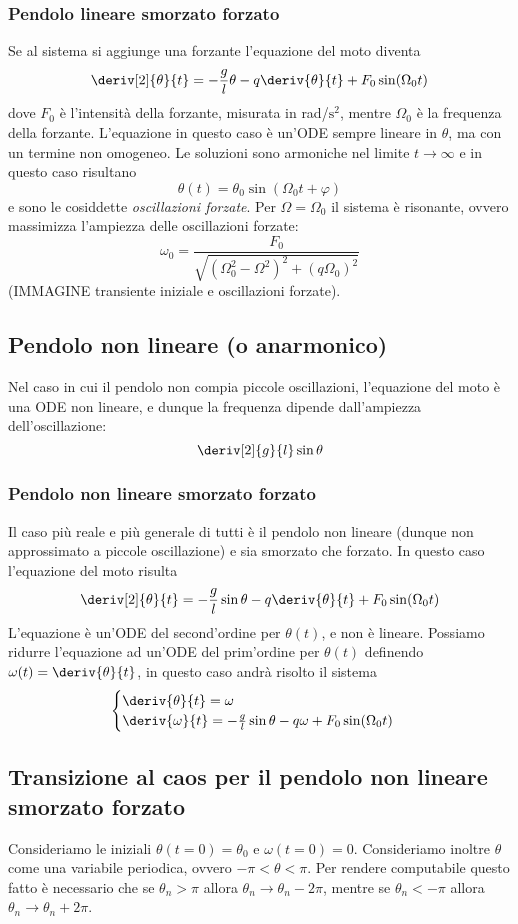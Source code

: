 \subsubsection{Pendolo lineare smorzato forzato}
Se al sistema si aggiunge una forzante l'equazione del moto diventa
\[
\deriv[2]{\theta}{t} = - \frac{g}{l} \theta - q \deriv{\theta}{t} + F_0 \sin(\Omega_0 t)
\]
dove $F_0$ è l'intensità della forzante, misurata in rad/$\mathrm{s}^2$, mentre $\Omega_0$ è la frequenza della forzante. L'equazione in questo caso è un'ODE sempre lineare in $\theta$, ma con un termine non omogeneo. Le soluzioni sono armoniche nel limite $t \to \infty$ e in questo caso risultano
\[
\theta(t) = \theta_0 \sin(\Omega_0 t + \varphi)
\]
e sono le cosiddette \emph{oscillazioni forzate}. Per $\Omega = \Omega_0$ il sistema è risonante, ovvero massimizza l'ampiezza delle oscillazioni forzate:
\[
\omega_0 = \frac{F_0}{\sqrt{(\Omega^2_0 - \Omega^2)^2 + (q \Omega_0)^2}}
\]
(IMMAGINE transiente iniziale e oscillazioni forzate).

\subsection{Pendolo non lineare (o anarmonico)}
Nel caso in cui il pendolo non compia piccole oscillazioni, l'equazione del moto è una ODE non lineare, e dunque la frequenza dipende dall'ampiezza dell'oscillazione:
\[
\deriv[2]{g}{l} \sin\theta
\]

\subsubsection{Pendolo non lineare smorzato forzato}
Il caso più reale e più generale di tutti è il pendolo non lineare (dunque non approssimato a piccole oscillazione) e sia smorzato che forzato. In questo caso l'equazione del moto risulta
\[
\deriv[2]{\theta}{t} = - \frac{g}{l} \sin\theta - q \deriv{\theta}{t} + F_0 \sin(\Omega_0 t)
\]
L'equazione è un'ODE del second'ordine per $\theta(t)$, e non è lineare. Possiamo ridurre l'equazione ad un'ODE del prim'ordine per $\theta(t)$ definendo $\omega(t) = \deriv{\theta}{t}$, in questo caso andrà risolto il sistema
\[
\begin{cases}
\deriv{\theta}{t} = \omega \\
\deriv{\omega}{t} = - \frac{g}{l} \sin\theta - q \omega + F_0 \sin(\Omega_0 t)
\end{cases}
\]

\subsection[Transizione al caos nel caso del pendolo]{Transizione al caos per il pendolo non lineare smorzato forzato}
Consideriamo le iniziali $\theta(t = 0) = \theta_0$ e $\omega(t = 0) = 0$. Consideriamo inoltre $\theta$ come una variabile periodica, ovvero $-\pi < \theta < \pi$. Per rendere computabile questo fatto è necessario che se $\theta_n > \pi$ allora $\theta_n \to \theta_n - 2 \pi$, mentre se $\theta_n < - \pi$ allora $\theta_n \to \theta_n + 2 \pi$.

